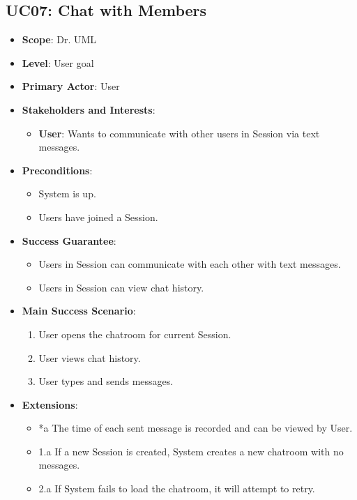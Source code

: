 \documentclass[12pt]{article}
\begin{document}
    \subsection{UC07: Chat with Members}
    \begin{itemize}
        \item \textbf{Scope}: Dr. UML
        \item \textbf{Level}: User goal
        \item \textbf{Primary Actor}: User
        \item \textbf{Stakeholders and Interests}:
        \begin{itemize}
            \item \textbf{User}: Wants to communicate with other users in Session via text messages.
        \end{itemize}
        \item \textbf{Preconditions}:
        \begin{itemize}
            \item System is up.
            \item Users have joined a Session.
        \end{itemize}
        \item \textbf{Success Guarantee}:
        \begin{itemize}
            \item Users in Session can communicate with each other with text messages.
            \item Users in Session can view chat history.
        \end{itemize}
        \item \textbf{Main Success Scenario}:
        \begin{enumerate}
            \item User opens the chatroom for current Session.
            \item User views chat history.
            \item User types and sends messages.
        \end{enumerate}
        \item \textbf{Extensions}:
        \begin{itemize}
            \item *a The time of each sent message is recorded and can be viewed by User.
            \item 1.a If a new Session is created, System creates a new chatroom with no messages.
            \item 2.a If System fails to load the chatroom, it will attempt to retry.

\end{itemize}
\end{itemize}
\end{document}

